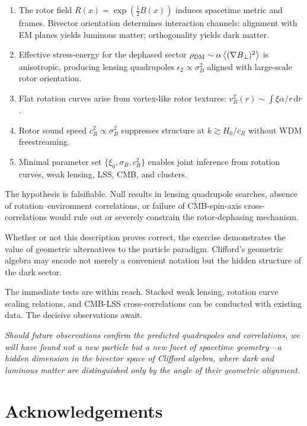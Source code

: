 \documentclass[11pt,a4paper]{article}
\numberwithin{equation}{section}
\theoremstyle{plain}
\theoremstyle{definition}
\theoremstyle{remark}
\newcommand{\dd}{\mathrm{d}}
\newcommand{\avg}[1]{\left\langle #1 \right\rangle}
\begin{document}
\begin{enumerate}[leftmargin=*]
  \item The rotor field $R(x)=\exp(\tfrac12 B(x))$ induces spacetime metric and frames. Bivector orientation determines interaction channels: alignment with EM planes yields luminous matter; orthogonality yields dark matter.
  \item Effective stress-energy for the dephased sector $\rho_{\rm DM}\sim\alpha\avg{(\nabla B_\perp)^2}$ is anisotropic, producing lensing quadrupoles $\epsilon_2\propto\sigma_B^2$ aligned with large-scale rotor orientation.
  \item Flat rotation curves arise from vortex-like rotor textures: $v_R^2(r)\sim \int \xi\alpha/r\,\dd r$.
  \item Rotor sound speed $c_R^2\propto\sigma_B^2$ suppresses structure at $k\gtrsim H_0/c_R$ without WDM freestreaming.
  \item Minimal parameter set $\{\xi_0,\sigma_B,c_R^2\}$ enables joint inference from rotation curves, weak lensing, LSS, CMB, and clusters.
\end{enumerate}

The hypothesis is falsifiable. Null results in lensing quadrupole searches, absence of rotation--environment correlations, or failure of CMB-spin-axis cross-correlations would rule out or severely constrain the rotor-dephasing mechanism.

Whether or not this description proves correct, the exercise demonstrates the value of geometric alternatives to the particle paradigm. Clifford's geometric algebra may encode not merely a convenient notation but the hidden structure of the dark sector.

The immediate tests are within reach. Stacked weak lensing, rotation curve scaling relations, and CMB-LSS cross-correlations can be conducted with existing data. The decisive observations await.

\medskip
\noindent\textit{Should future observations confirm the predicted quadrupoles and correlations, we will have found not a new particle but a new facet of spacetime geometry---a hidden dimension in the bivector space of Clifford algebra, where dark and luminous matter are distinguished only by the angle of their geometric alignment.}

\vspace{1em}

\section*{Acknowledgements}
\end{document}
